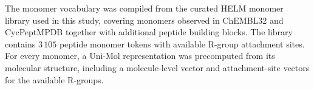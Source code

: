 \begin{methods}
The monomer vocabulary was compiled from the curated HELM monomer library used in this study, covering monomers observed in ChEMBL32 and CycPeptMPDB together with additional peptide building blocks.
The library contains $3\,105$ peptide monomer tokens with available R-group attachment sites.
For every monomer, a Uni-Mol representation was precomputed from its molecular structure, including a molecule-level vector and attachment-site vectors for the available R-groups.

\end{methods}
